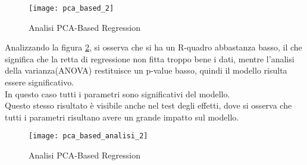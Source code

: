 \begin{figure}[!htbp]
  \centering
  \texttt{[image: pca\_based\_2]}
  \caption{Analisi PCA-Based Regression}
  \label{pca_based_2}
\end{figure}

\clearpage

Analizzando la figura \ref{pca_based_analisi_2}, si osserva che si ha un R-quadro
abbastanza basso, il che significa che la retta di regressione non fitta troppo
bene i dati, mentre l'analisi della varianza(ANOVA) restituisce un p-value basso,
quindi il modello risulta essere significativo.\\
In questo caso tutti i parametri sono significativi del modello.\\
Questo stesso risultato è visibile anche nel test degli effetti, dove si osserva
che tutti i parametri risultano avere un grande impatto sul modello.\\

\begin{figure}[!htbp]
  \centering
  \texttt{[image: pca\_based\_analisi\_2]}
  \caption{Analisi PCA-Based Regression}
  \label{pca_based_analisi_2}
\end{figure}
